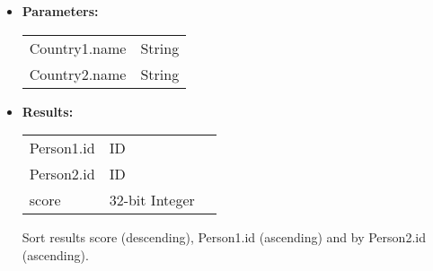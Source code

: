 {\begin{enumerate}
\begin{itemize}
                   \begin{itemize}

                     \item  p1 has left a Comment on p2's Comment or post, this has the score 4
                     \item  p1 has created a post or comment that was commented by p2, this has the score 1
                     \item  p1 and p2 are friends, score 15
                     \item  p1 liked a post or comment by p2, score 10
                     \item  p1 has created a post or comment that was liked by p2, score 1

                       For all pairs of people (p1, p2) such that p1 is in some city
                       of country X and p2 is anywhere in country Y, find the pairs
                       with the largest communication score (one pair per any city
                       in country X)
                   \end{itemize}
                \item \textbf{Parameters:} \\
                    \begin{tabular}{ll}
                      Country1.name & String \\
                      Country2.name & String \\
                    \end{tabular}
                \item \textbf{Results:} \\
                    \begin{tabular}{lll}
                      Person1.id & ID & \\
                      Person2.id & ID & \\
                      score & 32-bit Integer & \\
                    \end{tabular}

                    Sort results score (descending), Person1.id (ascending) and by Person2.id (ascending).
                    \end{itemize}


\end{enumerate}}
